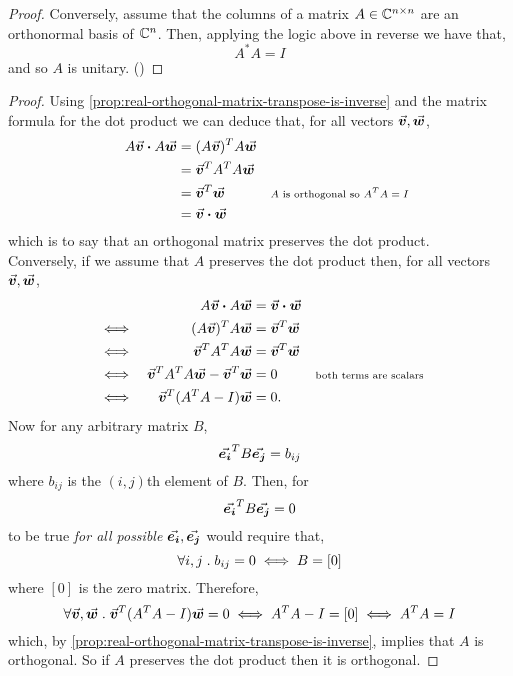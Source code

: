 \documentclass[../MathsNotesBase.tex]{subfiles}
\begin{document}
{\begin{proof}
			Conversely, assume that the columns of a matrix ${ A \in \mathbb{C}^{n \times n} }$ are an orthonormal basis of $\mathbb{C}^{n}$. Then, applying the logic above in reverse we have that,
			\[ A^* A = I \]
			and so $A$ is unitary. ()
		\end{proof}
		
		
		
		\bigskip
		\begin{proof}
			Using \autoref{prop:real-orthogonal-matrix-transpose-is-inverse} and the matrix formula for the dot product we can deduce that, for all vectors ${ \vec{\bm{v}},\vec{\bm{w}} }$,
			\begin{align*}
				&& A\vec{\bm{v}} \boldsymbol{\cdot} A\vec{\bm{w}} &= (A\vec{\bm{v}})^T A\vec{\bm{w}} \\
				&&  &= \vec{\bm{v}}^TA^TA\vec{\bm{w}} &\text{\scriptsize{}} \\
				&&  &= \vec{\bm{v}}^T\vec{\bm{w}} &\text{\scriptsize{$A$ is orthogonal so ${A^TA = I}$}} \\
				&&  &= \vec{\bm{v}} \boldsymbol{\cdot} \vec{\bm{w}}
			\end{align*}
			which is to say that an orthogonal matrix preserves the dot product.\\
			
			Conversely, if we assume that $A$ preserves the dot product then, for all vectors ${ \vec{\bm{v}},\vec{\bm{w}} }$,
			\begin{align*}
				&& A\vec{\bm{v}} \boldsymbol{\cdot} A\vec{\bm{w}} &= \vec{\bm{v}} \boldsymbol{\cdot} \vec{\bm{w}}  \\
				&\iff & (A\vec{\bm{v}})^TA\vec{\bm{w}} &= \vec{\bm{v}}^T\vec{\bm{w}} & \\
				&\iff & \vec{\bm{v}}^TA^TA\vec{\bm{w}} &= \vec{\bm{v}}^T\vec{\bm{w}} & \\
				&\iff & \vec{\bm{v}}^TA^TA\vec{\bm{w}} - \vec{\bm{v}}^T\vec{\bm{w}} &= 0 & \text{\scriptsize{both terms are scalars}}\\
				&\iff & \vec{\bm{v}}^T(A^TA - I)\vec{\bm{w}} &= 0. &
			\end{align*}
			Now for any arbitrary matrix $B$, 
			\[ \vec{\bm{e_i}}^T B \vec{\bm{e_j}} = b_{ij} \]
			where $b_{ij}$ is the $(i,j)$th element of $B$. Then, for
			\[ \vec{\bm{e_i}}^T B \vec{\bm{e_j}} = 0 \]
			to be true \textit{for all possible} ${ \vec{\bm{e_i}},\vec{\bm{e_j}} }$ would require that, 
			\[ \forall i,j \;.\; b_{ij} = 0 \iff B = [0] \]
			where $[0]$ is the zero matrix. Therefore,
			\[ \forall \vec{\bm{v}},\vec{\bm{w}} \;.\; \vec{\bm{v}}^T(A^TA - I)\vec{\bm{w}} = 0 \iff A^TA - I = [0] \iff A^TA = I \]
			which, by \autoref{prop:real-orthogonal-matrix-transpose-is-inverse}, implies that $A$ is orthogonal. So if $A$ preserves the dot product then it is orthogonal.
		\end{proof}
	
}
\end{document}
